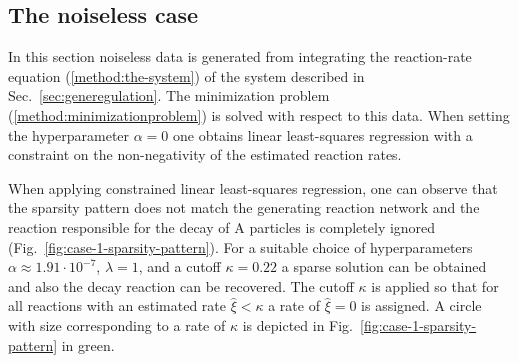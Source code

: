 \documentclass[oneside, abstracton, titlepage]{scrartcl}
\begin{document}
	\subsection{The noiseless case}\label{sec:case-1}
	
	In this section noiseless data is generated from integrating the reaction-rate equation (\ref{method:the-system}) of the system described in Sec.~\ref{sec:generegulation}. The minimization problem (\ref{method:minimizationproblem}) is solved with respect to this data. When setting the hyperparameter $\alpha=0$ one obtains linear least-squares regression with a constraint on the non-negativity of the estimated reaction rates.
	
	When applying constrained linear least-squares regression, one can observe that the sparsity pattern does not match the generating reaction network and the reaction responsible for the decay of $\mathrm{A}$ particles is completely ignored (Fig.~\ref{fig:case-1-sparsity-pattern}). For a suitable choice of hyperparameters $\alpha \approx 1.91\cdot 10^{-7}$, $\lambda=1$, and a cutoff $\kappa = 0.22$ a sparse solution can be obtained and also the decay reaction can be recovered. The cutoff $\kappa$ is applied so that for all reactions with an estimated rate $\hat{\xi} < \kappa$ a rate of $\hat{\xi} = 0$ is assigned. A circle with size corresponding to a rate of $\kappa$ is depicted in Fig.~\ref{fig:case-1-sparsity-pattern} in green.
	
\end{document}
